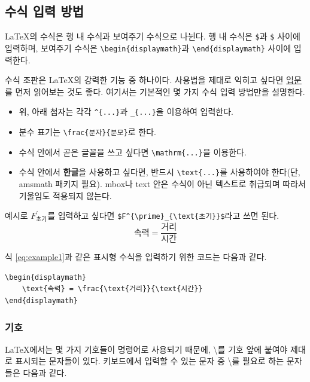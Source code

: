 \documentclass[11pt]{article}
\newcommand{\lshort}{%
	\href{http://texdoc.net/texmf-dist/doc/latex/%
		lshort-korean/lshort-kr.pdf%
	}{\LaTeXe 입문}%
}
\begin{document}
\subsection{수식 입력 방법}
\LaTeX 의 수식은 행 내 수식과 보여주기 수식으로 나뉜다. 행 내 수식은 \verb|$|과 
\verb|$| 사이에 입력하며, 보여주기 수식은 
\verb|\begin{displaymath}|과 \verb|\end{displaymath}| 사이에 입력한다.

수식 조판은 \LaTeX 의 강력한 기능 중 하나이다. 사용법을 제대로 익히고 싶다면 
\lshort 를 먼저 읽어보는 것도 좋다.
여기서는 기본적인 몇 가지 수식 입력 방법만을 설명한다.

\begin{itemize}
	\item 위, 아래 첨자는 각각 \verb|^{...}|과 \verb|_{...}|을 이용하여 
	입력한다.
	\item 분수 표기는 \verb|\frac{분자}{분모}|로 한다.
	\item 수식 안에서 곧은 글꼴을 쓰고 싶다면 \verb|\mathrm{...}|을 
	이용한다.
	\item 수식 안에서 {\bf 한글}을 사용하고 싶다면, 반드시 
	\verb|\text{...}|를 사용하여야 한다(단, amsmath 패키지 필요). mbox나 
	text 안은 수식이 아닌 텍스트로 취급되며 따라서 
	기울임도 적용되지 않는다.
\end{itemize}

예시로 $F^{\prime}_{\text{초기}}$를 입력하고 싶다면 
\verb|$F^{\prime}_{\text{초기}}$|라고 쓰면 된다.
\begin{equation} \label{eq:example1}
	\text{속력} = \frac{\text{거리}}{\text{시간}}
\end{equation}

식 \ref{eq:example1}과 같은 표시형 수식을 입력하기 위한 코드는 다음과 같다.

\begin{verbatim}
\begin{displaymath}
	\text{속력} = \frac{\text{거리}}{\text{시간}}
\end{displaymath}
\end{verbatim}

\subsubsection{기호}
\LaTeX 에서는 몇 가지 기호들이 명령어로 사용되기 때문에, \textbackslash 를 기호 
앞에 붙여야 제대로 표시되는 문자들이 있다. 키보드에서 입력할 수 있는 문자 중 
\textbackslash 를 필요로 하는 문자들은 다음과 같다.
\end{document}
